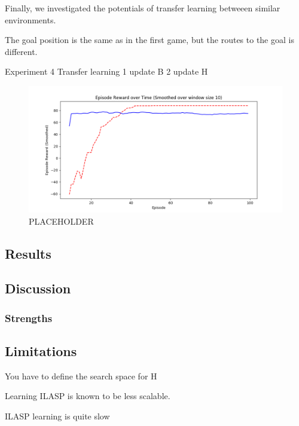 Finally, we investigated the potentials of transfer learning betweeen similar environments. 

The goal position is the same as in the first game, but the routes to the goal is different. 

Experiment 4 Transfer learning 
    1 update B
    2 update H

\begin{figure}[!htb]
\centering
\includegraphics[width=1.0\textwidth]{./figures/placeholder}
\caption{PLACEHOLDER}
\label{proposed_architecture}
\end{figure}


\subsection{Results}

\subsection{Discussion}
\subsubsection{Strengths}

\subsection{Limitations}

You have to define the search space for H

Learning ILASP is known to be less scalable. 

ILASP learning is quite slow